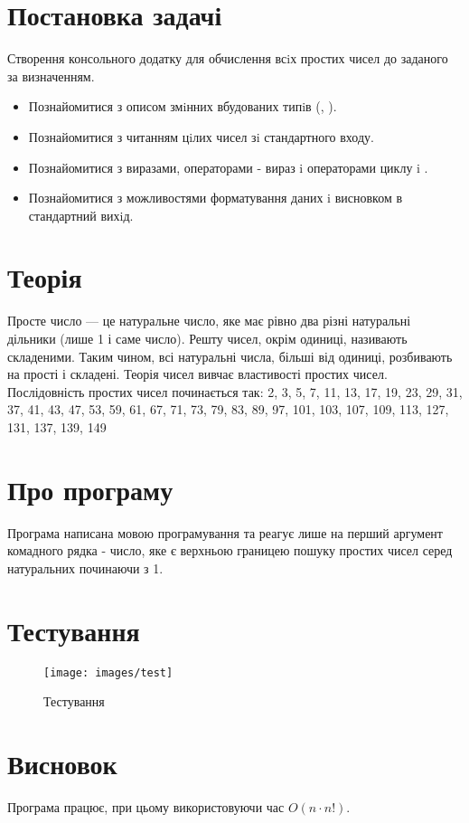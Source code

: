 \nocite{*}
\sffamily

\section{Постановка задачі}
 Створення консольного додатку для обчислення всiх простих чисел
до заданого за визначенням.
\begin{itemize}
\item Познайомитися з описом змiнних вбудованих типiв (, ).
\item Познайомитися з читанням цiлих чисел зi стандартного входу.
\item Познайомитися з виразами, операторами - вираз i операторами
	циклу  i .
\item Познайомитися з можливостями форматування даних i висновком в стандартний вихiд.
\end{itemize}

\section{Теорія}
\begin{dfn}
Просте число  — це натуральне число, яке має рівно два різні натуральні дільники (лише 1 і саме число). Решту чисел, окрім одиниці, називають складеними. Таким чином, всі натуральні числа, більші від одиниці, розбивають на прості і складені. Теорія чисел вивчає властивості простих чисел.
Послідовність простих чисел починається так:
2, 3, 5, 7, 11, 13, 17, 19, 23, 29, 31, 37, 41, 43, 47, 53, 59, 61, 67, 71, 73, 79, 83, 89, 97, 101, 103, 107, 109, 113, 127, 131, 137, 139, 149
\end{dfn}

\section{Про програму}
Програма написана мовою програмування  та реагує лише на перший аргумент комадного рядка - число, яке є верхньою границею пошуку простих чисел серед натуральних починаючи з 1.

\section{Тестування}
\begin{figure}[H]
	\centering
	\texttt{[image: images/test]}
	\caption{Тестування}
	\label{fig:test}
\end{figure}

\section{Висновок}
Програма працює, при цьому використовуючи час \(O(n\cdot n!)\).